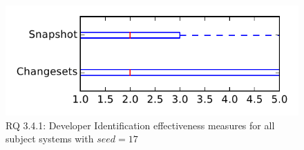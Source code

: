 
\begin{figure}
\centering
\includegraphics[height=0.4\textheight]{figures/dit_seed/rq1_tiny_17}
\caption{RQ 3.4.1: Developer Identification effectiveness measures for all subject systems with $seed=17$}
\label{fig:dit_seed:rq1:tiny}
\end{figure}
